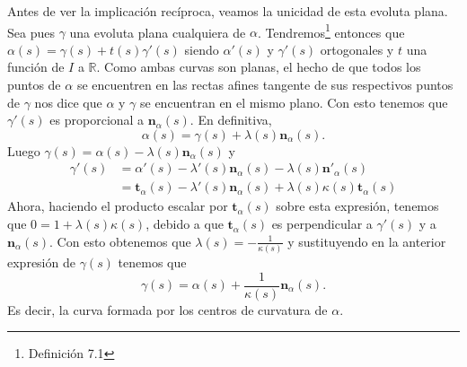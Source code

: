 Antes de ver la implicación recíproca, veamos la unicidad de esta evoluta plana.
Sea pues $\gamma$ una evoluta plana cualquiera de $\alpha$.
Tendremos\footnote{Definición 7.1\cite{sanjurjo}} entonces que $\alpha\left( s
\right) = \gamma\left( s \right) + t\left( s \right)\gamma'\left( s \right)$
siendo $\alpha'\left( s \right)$ y $\gamma'\left( s \right)$ ortogonales y $t$
una función de $I$ a $\mathbb{R}$. Como ambas curvas son planas, el hecho de que
todos los puntos de $\alpha$ se encuentren en las rectas afines tangente de sus
respectivos puntos de $\gamma$ nos dice que $\alpha$ y $\gamma$ se encuentran en
el mismo plano. Con esto tenemos que $\gamma'\left( s \right)$ es proporcional a
$\mathbf{n}_{\alpha}\left( s \right)$. En definitiva,
\[
\alpha\left( s \right) = \gamma\left( s \right) + \lambda\left( s
\right)\mathbf{n}_{\alpha} \left( s \right).
\]
Luego $\gamma\left( s \right) = \alpha\left( s \right) - \lambda\left( s
\right)\mathbf{n}_{\alpha}\left( s \right)$ y
\begin{align*}
    \gamma'\left( s \right) &= \alpha'\left( s \right) - \lambda'\left( s \right)
    \mathbf{n}_{\alpha}\left( s \right) - \lambda\left( s
    \right)\mathbf{n}'_{\alpha}\left( s \right)\\
    &= \mathbf{t}_{\alpha}\left( s \right) - \lambda'\left( s
    \right)\mathbf{n}_{\alpha}\left( s \right) + \lambda\left( s \right)
    \kappa\left( s \right) \mathbf{t}_{\alpha}\left( s \right)
\end{align*}
Ahora, haciendo el producto escalar por $\mathbf{t}_{\alpha}\left( s \right)$
sobre esta expresión, tenemos que $0 = 1 + \lambda\left( s
\right)\kappa\left( s \right)$, debido a que $\mathbf{t}_{\alpha}\left(
s\right)$ es perpendicular a $\gamma'\left( s \right)$ y a
$\mathbf{n}_{\alpha}\left( s \right)$. Con esto obtenemos que $\lambda\left( s \right)
= -\frac{1}{\kappa\left( s \right)}$ y sustituyendo en la anterior
expresión de $\gamma\left( s \right)$ tenemos que
\[
\gamma\left( s \right) = \alpha\left( s \right) + \frac{1}{\kappa\left(
s \right)} \mathbf{n}_{\alpha}\left( s \right).
\]
Es decir, la curva formada por los centros de curvatura de $\alpha$.

